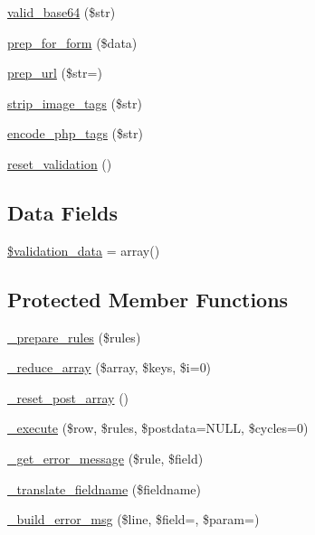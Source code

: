 \begin{DoxyCompactItemize}
\mbox{\hyperlink{class_c_i___form__validation_a9bec2f0a508e0327d4b048ecfc204522}{valid\+\_\+base64}} (\$str)
\item 
\mbox{\hyperlink{class_c_i___form__validation_a53938e0a994c9995de5c979ecb27bf1d}{prep\+\_\+for\+\_\+form}} (\$data)
\item 
\mbox{\hyperlink{class_c_i___form__validation_a1218a70d68fe797013a53b3c7cd41d2f}{prep\+\_\+url}} (\$str=\textquotesingle{}\textquotesingle{})
\item 
\mbox{\hyperlink{class_c_i___form__validation_abb836a42971c7bc641588db779c6ab1d}{strip\+\_\+image\+\_\+tags}} (\$str)
\item 
\mbox{\hyperlink{class_c_i___form__validation_ae8fff4cb083a2a66c900f8bd61216bdd}{encode\+\_\+php\+\_\+tags}} (\$str)
\item 
\mbox{\hyperlink{class_c_i___form__validation_a84b8bd64032f6be532968015cba11361}{reset\+\_\+validation}} ()
\end{DoxyCompactItemize}
\subsection*{Data Fields}
\begin{DoxyCompactItemize}
\item 
\mbox{\hyperlink{class_c_i___form__validation_af1df05337bb40c1d30c3d8c62fe8696c}{\$validation\+\_\+data}} = array()
\end{DoxyCompactItemize}
\subsection*{Protected Member Functions}
\begin{DoxyCompactItemize}
\item 
\mbox{\hyperlink{class_c_i___form__validation_ada388c3a7f360165699597f638faf127}{\+\_\+prepare\+\_\+rules}} (\$rules)
\item 
\mbox{\hyperlink{class_c_i___form__validation_a20ed7e44a35f5a5f6db5a6b220151df0}{\+\_\+reduce\+\_\+array}} (\$array, \$keys, \$i=0)
\item 
\mbox{\hyperlink{class_c_i___form__validation_a5cb72e21d23a62d15655b8caaa493698}{\+\_\+reset\+\_\+post\+\_\+array}} ()
\item 
\mbox{\hyperlink{class_c_i___form__validation_a00fc7d98650d07098dd4a13b486c3dea}{\+\_\+execute}} (\$row, \$rules, \$postdata=N\+U\+LL, \$cycles=0)
\item 
\mbox{\hyperlink{class_c_i___form__validation_a1c0eda169a1c36fe0bcc61a863690297}{\+\_\+get\+\_\+error\+\_\+message}} (\$rule, \$field)
\item 
\mbox{\hyperlink{class_c_i___form__validation_ae6b1edc93754376c05622d905845c215}{\+\_\+translate\+\_\+fieldname}} (\$fieldname)
\item 
\mbox{\hyperlink{class_c_i___form__validation_a970cb9f78d6cefc93e795d4d72e085af}{\+\_\+build\+\_\+error\+\_\+msg}} (\$line, \$field=\textquotesingle{}\textquotesingle{}, \$param=\textquotesingle{}\textquotesingle{})
\end{DoxyCompactItemize}
